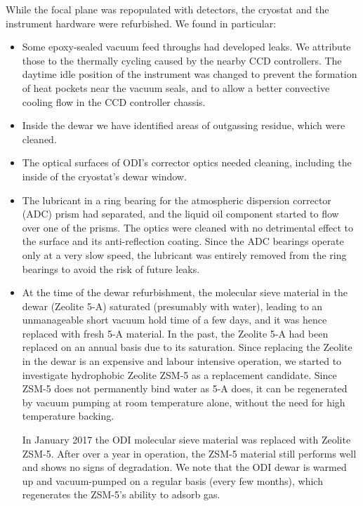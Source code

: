 \documentclass[]{spieman}
\begin{document}
While the focal plane was repopulated with detectors, the cryostat and the 
instrument hardware were refurbished. We found in particular:
\begin{itemize}
	\item Some epoxy-sealed vacuum feed throughs had developed  leaks. We 
	attribute those to the thermally cycling caused by the nearby CCD controllers. 
	The daytime idle position of the instrument was changed to prevent the 
	formation of heat pockets near the vacuum seals, and to allow a better
	convective cooling flow in the CCD controller chassis.
	
	\item Inside the dewar we have identified areas of outgassing residue, which 
	were cleaned.

	\item The optical surfaces of ODI's corrector optics needed cleaning,
	 including the inside of the cryostat's dewar window. 
	
	\item The lubricant in a ring bearing for the atmospheric dispersion 
	corrector (ADC) prism had separated, and the liquid oil component started to 
	flow over one of the prisms. The optics were cleaned with no detrimental effect 
	to the surface and its anti-reflection coating. Since the ADC bearings operate 
	only at a very slow speed, the lubricant was entirely removed from the 
	ring bearings to avoid the risk of future leaks. 
	

\item  At the time of the dewar refurbishment, the molecular sieve material in
the dewar (Zeolite 5-A) saturated (presumably with water), leading to an
unmanageable short vacuum hold time of a few days, and it was hence replaced
with fresh 5-A material. In the past, the Zeolite 5-A had been replaced on an
annual basis due to its saturation. Since replacing the Zeolite in the dewar is
an expensive and labour intensive operation, we started to investigate
hydrophobic Zeolite ZSM-5 as a replacement candidate. Since ZSM-5 does not
permanently bind water as 5-A does, it can be regenerated by vacuum pumping at
room temperature alone, without the need for high temperature backing.

In January 2017 the ODI molecular sieve material was replaced with Zeolite
ZSM-5. After over a year in operation, the ZSM-5 material still performs well
and shows no signs of degradation. We note that the ODI dewar is warmed up and
vacuum-pumped on a regular basis (every few months), which
regenerates the ZSM-5's ability to adsorb gas.

\end{itemize}
\end{document}
